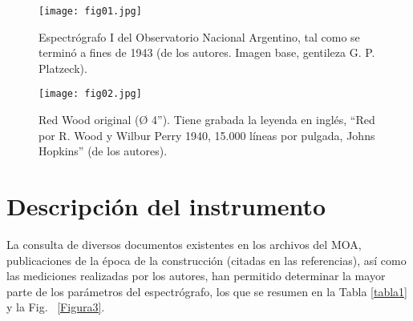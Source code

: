 \documentclass[baaa]{baaa}
\begin{document}
\begin{figure}[!t]
\centering
\texttt{[image: fig01.jpg]}
\caption{Espectrógrafo I del Observatorio Nacional Argentino, tal como se terminó a fines de 1943 (de los autores. Imagen base, gentileza G. P. Platzeck).}
\label{Figura1}
\end{figure}

\begin{figure}[!t]
\centering
\texttt{[image: fig02.jpg]}
\caption{Red Wood original (Ø 4”). Tiene grabada la leyenda en inglés, “Red por R. Wood y Wilbur Perry 1940, 15.000 líneas por pulgada, Johns Hopkins” (de los autores).}
\label{Figura2}
\end{figure}


\section{Descripción del instrumento}

La consulta de diversos documentos existentes en los archivos del MOA, publicaciones de la época de la construcción (citadas en las referencias), así como las mediciones realizadas por los autores, han permitido determinar la mayor parte de los parámetros del espectrógrafo, los que se resumen en la Tabla \ref{tabla1} y la Fig. ~\ref{Figura3}.
\end{document}
